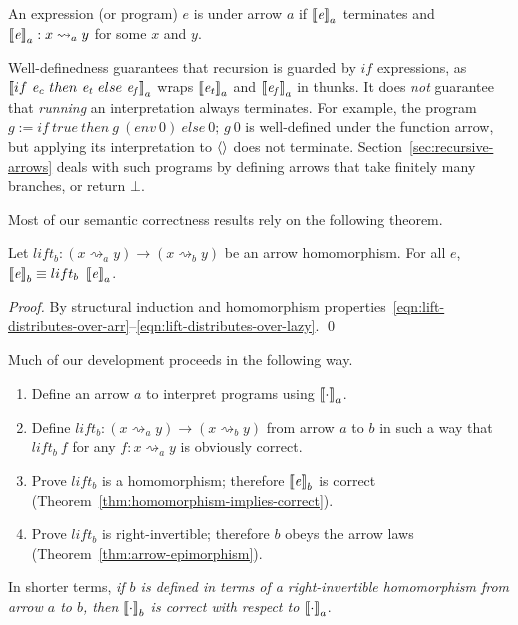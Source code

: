 \documentclass{llncs}
\newcommand{\arrow}{\rightsquigarrow}
\newcommand{\gen}{_a}
\newcommand{\genb}{_b}
\begin{document}
\begin{definition}
\label{def:well-defined-expression}
An expression (or program) $\mathit{e}$ is  under arrow $a$ if $\meaningof{\mathit{e}}\gen$ terminates and $\meaningof{\mathit{e}}\gen : x \arrow\gen y$ for some $x$ and $y$.
\end{definition}

Well-definedness guarantees that recursion is guarded by $if$ expressions, as $\meaningof{if~\mathit{e_c}~then~\mathit{e_t}~else~\mathit{e_f}}\gen$ wraps $\meaningof{\mathit{e_t}}\gen$ and $\meaningof{\mathit{e_f}}\gen$ in thunks.
It does \emph{not} guarantee that \emph{running} an interpretation always terminates.
For example, the program
$g := if~true~then~g~(env~0)~else~0;\,g~0$
is well-defined under the function arrow, but applying its interpretation to $\langle{}\rangle$ does not terminate.
Section~\ref{sec:recursive-arrows} deals with such programs by defining arrows that take finitely many branches, or return $\bot$.

Most of our semantic correctness results rely on the following theorem.

\begin{theorem}
\label{thm:homomorphism-implies-correct}
Let $lift\genb : (x \arrow\gen y) \to (x \arrow\genb y)$ be an arrow homomorphism.
For all $\mathit{e}$, $\meaningof{\mathit{e}}\genb \equiv lift\genb~\meaningof{\mathit{e}}\gen$.%
\end{theorem}
\begin{proof}
By structural induction and homomorphism properties~\eqref{eqn:lift-distributes-over-arr}--\eqref{eqn:lift-distributes-over-lazy}.
\qed
\end{proof}

Much of our development proceeds in the following way.
\begin{enumerate}
	\item Define an arrow $a$ to interpret programs using $\left\llbracket{\cdot}\right\rrbracket_a$.
	\item Define $lift\genb : (x \arrow\gen y) \to (x \arrow\genb y)$ from arrow $a$ to $b$ in such a way that $lift\genb~f$ for any $f : x \arrow_a y$ is obviously correct.
	\item Prove $lift_b$ is a homomorphism; therefore $\meaningof{\mathit{e}}\genb$ is correct (Theorem~\ref{thm:homomorphism-implies-correct}).
	\item Prove $lift_b$ is right-invertible; therefore $b$ obeys the arrow laws (Theorem~\ref{thm:arrow-epimorphism}).
\end{enumerate}
In shorter terms, \emph{if $b$ is defined in terms of a right-invertible homomorphism from arrow $a$ to $b$, then $\left\llbracket{\cdot}\right\rrbracket_b$ is correct with respect to $\left\llbracket{\cdot}\right\rrbracket_a$}.
\end{document}
